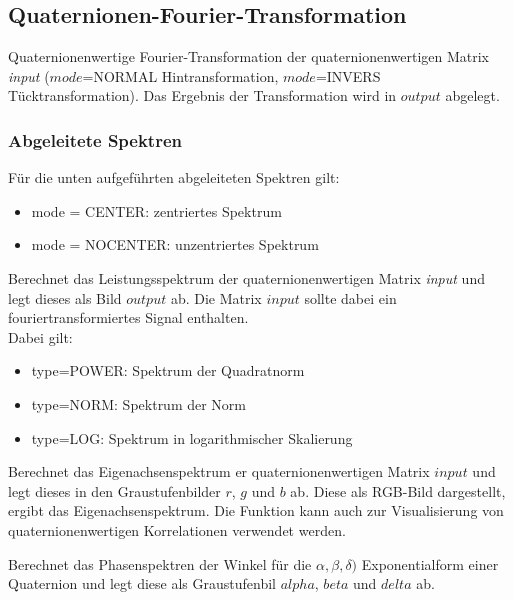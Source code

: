 \subsection{Quaternionen-Fourier-Transformation}
\descr
{
Quaternionenwertige Fourier-Transformation der quaternionenwertigen Matrix \textit{input} 
($mode$=NORMAL Hintransformation, $mode$=INVERS Tücktransformation). Das
Ergebnis der Transformation wird in $output$ abgelegt.
}
\subsubsection{Abgeleitete Spektren}
Für die unten aufgeführten abgeleiteten Spektren gilt:
\begin{itemize}
\item mode = CENTER: zentriertes Spektrum
\item mode = NOCENTER: unzentriertes Spektrum
\end{itemize}
 
\descr
{
Berechnet das Leistungsspektrum der quaternionenwertigen Matrix \textit{input} und
legt dieses als Bild $output$ ab. Die Matrix $input$ sollte dabei ein
fouriertransformiertes Signal enthalten.\\
Dabei gilt:
\begin{itemize}
\item type=POWER: Spektrum der Quadratnorm
\item type=NORM: Spektrum der Norm
\item type=LOG: Spektrum in logarithmischer Skalierung
\end{itemize}
}
	
	
\descr
{Berechnet das Eigenachsenspektrum er quaternionenwertigen Matrix $input$ und
legt dieses in den Graustufenbilder $r$, $g$ und $b$ ab.
Diese als RGB-Bild dargestellt, ergibt das Eigenachsenspektrum. Die Funktion 
kann auch zur Visualisierung von quaternionenwertigen Korrelationen verwendet werden.}
		
		\descr
		{			
			Berechnet das Phasenspektren der Winkel für die $\alpha,\beta,\delta)$ Exponentialform
			einer Quaternion und legt diese als Graustufenbil $alpha$, $beta$ und
			$delta$ ab.
		}
